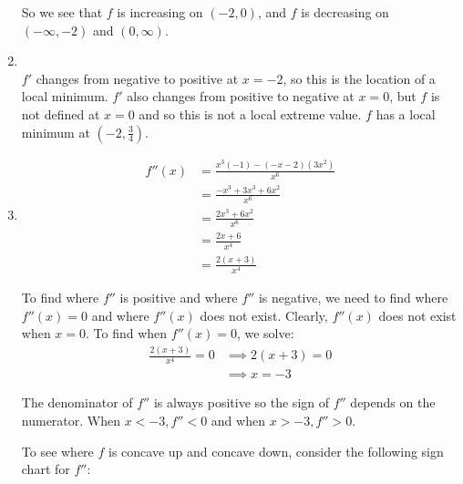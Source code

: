 \documentclass[nooutcomes,handout]{ximera}
\begin{document}
\begin{problem}
\begin{freeResponse}
\begin{enumerate}
       So we see that $f$ is increasing on $(-2,0)$, and $f$ is decreasing on $(-\infty, -2)$ and $(0,\infty)$.
       
     \item
         \\
       $f'$ changes from negative to positive at $x=-2$, so this is the location of a local minimum.
       $f'$ also changes from positive to negative at $x=0$, but $f$ is not defined at $x=0$ and so this is not a local extreme value.
       $f$ has a local minimum at $\left( -2,\frac{3}{4} \right)$.
			
			
			
     \item
       \begin{align*}
         f''(x) &= \frac{x^3(-1) - (-x-2)(3x^2)}{x^6} \\
                &= \frac{-x^3 + 3x^3 + 6x^2}{x^6} \\
		&= \frac{2x^3 + 6x^2}{x^6} \\
		&= \frac{2x+6}{x^4} \\
		&= \frac{2(x+3)}{x^4}
       \end{align*}
			
       To find where $f''$ is positive and where $f''$ is negative, we need to find where $f''(x) = 0$ and where $f''(x)$ does not exist.
       Clearly, $f''(x)$ does not exist when $x=0$.
       To find when $f''(x) = 0$, we solve:
       \begin{align*}
         \frac{2(x+3)}{x^4} = 0 &\implies 2(x+3) = 0\\
         &\implies x=-3
       \end{align*}

	The denominator of $f''$ is always positive so the sign of $f''$ depends on the numerator.  When $x<-3, f''<0$ and when $x>-3, f''>0$.		
									
       To see where $f$ is concave up and concave down, consider the following sign chart for $f''$:
       \begin{center}
         \begin{image}
         \end{image}
       \end{center}


\end{enumerate}
\end{freeResponse}
\end{problem}
\end{document}
